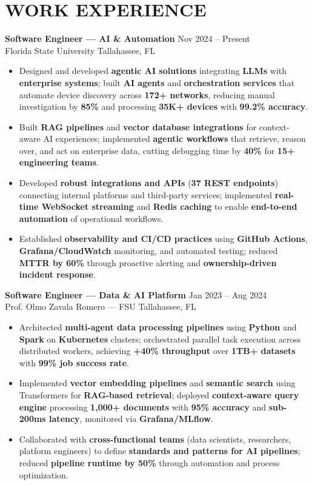 \documentclass[letterpaper,10pt]{article}
\newcommand{\resumeItem}[1]{\item\small #1}
\newcommand{\resumeSubheading}[4]{
  \vspace{6pt}
  \noindent
  \textbf{#1} \hfill {\footnotesize #2} \\
  [-1pt]
  \noindent
  \small #3 \hfill {\small #4}
  \vspace{3pt}
}
\newcommand{\resumeItemsStart}{\vspace{-2pt}\begin{itemize}}
\newcommand{\resumeItemsEnd}{\end{itemize}\vspace{6pt}}
\begin{document}
\section{\textcolor{metablue}{WORK EXPERIENCE}}
\vspace{-12pt}

\resumeSubheading
{Software Engineer — AI \& Automation}{Nov 2024 -- Present}
{Florida State University}{Tallahassee, FL}
\resumeItemsStart
\resumeItem{Designed and developed \textbf{agentic AI solutions} integrating \textbf{LLMs} with \textbf{enterprise systems}; built \textbf{AI agents} and \textbf{orchestration services} that automate device discovery across \textbf{172+ networks}, reducing manual investigation by \textbf{85\%} and processing \textbf{35K+ devices} with \textbf{99.2\% accuracy}.}
\resumeItem{Built \textbf{RAG pipelines} and \textbf{vector database integrations} for context-aware AI experiences; implemented \textbf{agentic workflows} that retrieve, reason over, and act on enterprise data, cutting debugging time by \textbf{40\%} for \textbf{15+ engineering teams}.}
\resumeItem{Developed \textbf{robust integrations and APIs} (\textbf{37 REST endpoints}) connecting internal platforms and third-party services; implemented \textbf{real-time WebSocket streaming} and \textbf{Redis caching} to enable \textbf{end-to-end automation} of operational workflows.}
\resumeItem{Established \textbf{observability and CI/CD practices} using \textbf{GitHub Actions}, \textbf{Grafana/CloudWatch} monitoring, and automated testing; reduced \textbf{MTTR by 60\%} through proactive alerting and \textbf{ownership-driven incident response}.}
\resumeItemsEnd
\vspace{-12pt}

\resumeSubheading
{Software Engineer — Data \& AI Platform}{Jan 2023 -- Aug 2024}
{Prof. Olmo Zavala Romero — FSU}{Tallahassee, FL}
\resumeItemsStart
\resumeItem{Architected \textbf{multi-agent data processing pipelines} using \textbf{Python} and \textbf{Spark} on \textbf{Kubernetes} clusters; orchestrated parallel task execution across distributed workers, achieving \textbf{+40\% throughput} over \textbf{1TB+ datasets} with \textbf{99\% job success rate}.}
\resumeItem{Implemented \textbf{vector embedding pipelines} and \textbf{semantic search} using Transformers for \textbf{RAG-based retrieval}; deployed \textbf{context-aware query engine} processing \textbf{1,000+ documents} with \textbf{95\% accuracy} and \textbf{sub-200ms latency}, monitored via \textbf{Grafana/MLflow}.}
\resumeItem{Collaborated with \textbf{cross-functional teams} (data scientists, researchers, platform engineers) to define \textbf{standards and patterns for AI pipelines}; reduced \textbf{pipeline runtime by 50\%} through automation and process optimization.}
\resumeItemsEnd
\vspace{-12pt}
\end{document}
